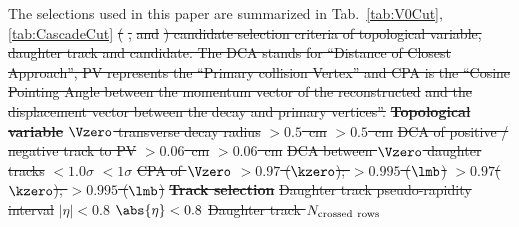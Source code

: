 \documentclass[ALICE,manyauthors]{cernphprep}
\providecommand{\DIFdel}[1]{{\protect\color{red}\sout{#1}}}                      %
\providecommand{\DIFdelbegin}{} %
\providecommand{\DIFdelFL}[1]{\DIFdel{#1}} %
\begin{document}
The selections used in this paper are summarized in Tab.~\ref{tab:V0Cut}, \ref{tab:CascadeCut}\DIFdelbegin %
{%
\DIFdelFL{(}%
\DIFdelFL{, }%
\DIFdelFL{and }%
\DIFdelFL{) candidate selection criteria of topological variable, daughter track and candidate.
			The DCA stands for ``Distance of Closest Approach'', PV represents the ``Primary collision Vertex'' and CPA is the ``Cosine Pointing Angle between the momentum vector of the reconstructed }%
\DIFdelFL{and the displacement vector between the decay and primary vertices''.}}
\textbf{\DIFdelFL{Topological variable}} %
\textbf{%
} %
\textbf{%
} %
\DIFdelFL{$\Vzero$ transverse decay radius      }%
\DIFdelFL{$> 0.5$~cm   }%
\DIFdelFL{$> 0.5$~cm }%
\DIFdelFL{DCA of positive / negative track to PV }%
\DIFdelFL{$> 0.06$~cm  }%
\DIFdelFL{$> 0.06$~cm }%
\DIFdelFL{DCA between $\Vzero$ daughter tracks  }%
\DIFdelFL{$< 1.0\sigma$ }%
\DIFdelFL{$< 1\sigma$ }%
\DIFdelFL{CPA of $\Vzero$ }%
\DIFdelFL{$> 0.97$ ($\kzero$); $>0.995$ ($\lmb$) }%
\DIFdelFL{$> 0.97$($\kzero$); $>0.995$ ($\lmb$) }%
\textbf{\DIFdelFL{Track selection}} %
\DIFdelFL{Daughter track pseudo-rapidity interval }%
\DIFdelFL{$|\eta| < 0.8$ }%
\DIFdelFL{$\abs{\eta} < 0.8$      }%
\DIFdelFL{Daughter track $N_{\rm crossed~rows}$                   }%
\end{document}
